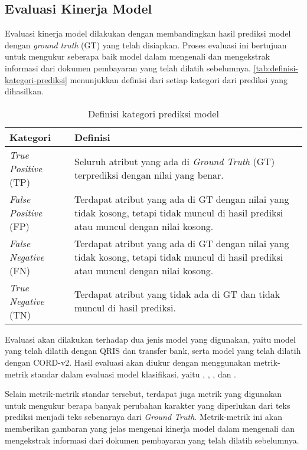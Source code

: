 \subsection{Evaluasi Kinerja Model}
\label{subsec:evaluasi-kinerja-model}

Evaluasi kinerja model dilakukan dengan membandingkan hasil prediksi model dengan \emph{ground truth} (GT) yang telah disiapkan. Proses evaluasi ini bertujuan untuk mengukur seberapa baik model dalam mengenali dan mengekstrak informasi dari dokumen pembayaran yang telah dilatih sebelumnya. \autoref{tab:definisi-kategori-prediksi} menunjukkan definisi dari setiap kategori dari prediksi yang dihasilkan.

\begin{table}[h!]
    \centering
    \caption{Definisi kategori prediksi model}
    \label{tab:definisi-kategori-prediksi}
    \begin{tabularx}{\textwidth}{|p{2.5cm}|X|}
        \hline
        \textbf{Kategori} & \textbf{Definisi} \\ \hline
        \emph{True Positive} (TP) & Seluruh atribut yang ada di \emph{Ground Truth} (GT) terprediksi dengan nilai yang benar. \\ \hline
        \emph{False Positive} (FP) & Terdapat atribut yang ada di GT dengan nilai yang tidak kosong, tetapi tidak muncul di hasil prediksi atau muncul dengan nilai kosong. \\ \hline
        \emph{False Negative} (FN) & Terdapat atribut yang ada di GT dengan nilai yang tidak kosong, tetapi tidak muncul di hasil prediksi atau muncul dengan nilai kosong. \\ \hline
        \emph{True Negative} (TN) & Terdapat atribut yang tidak ada di GT dan tidak muncul di hasil prediksi. \\ \hline
    \end{tabularx}
\end{table}

Evaluasi akan dilakukan terhadap dua jenis model yang digunakan, yaitu model \donut{} yang telah dilatih dengan \dataset{} QRIS dan transfer bank, serta model \donut{} yang telah dilatih dengan \dataset{} CORD-v2. Hasil evaluasi akan diukur dengan menggunakan metrik-metrik standar dalam evaluasi model klasifikasi, yaitu \accuracy, \precision, \recall, dan \fscore. 

Selain metrik-metrik standar tersebut, terdapat juga metrik \mcer{} yang digunakan untuk mengukur berapa banyak perubahan karakter yang diperlukan dari teks prediksi menjadi teks sebenarnya dari \emph{Ground Truth}. Metrik-metrik ini akan memberikan gambaran yang jelas mengenai kinerja model dalam mengenali dan mengekstrak informasi dari dokumen pembayaran yang telah dilatih sebelumnya.

